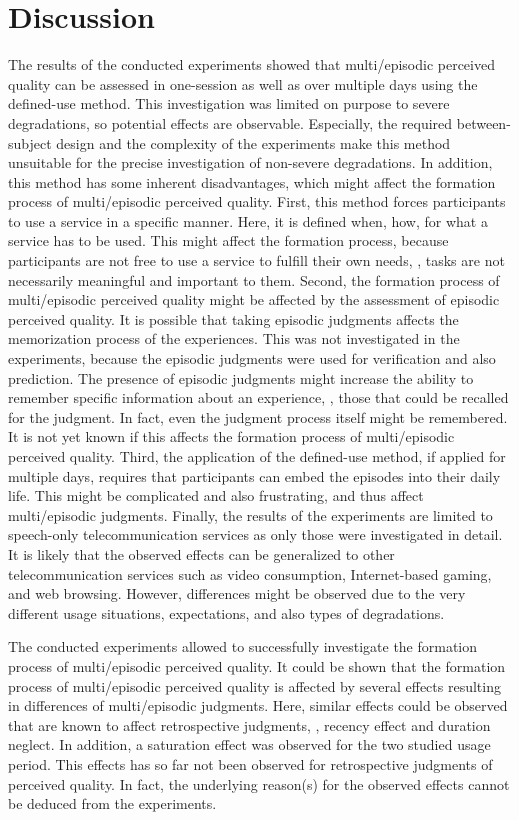\section{Discussion}
The results of the conducted experiments showed that multi\-/episodic perceived quality can be assessed in one-session as well as over multiple days using the defined-use method.
This investigation was limited on purpose to severe degradations, so potential effects are observable.
Especially, the required between-subject design and the complexity of the experiments make this method unsuitable for the precise investigation of non-severe degradations.
In addition, this method has some inherent disadvantages, which might affect the formation process of multi\-/episodic perceived quality.
First, this method forces participants to use a service in a specific manner.
Here, it is defined when, how, for what a service has to be used.
This might affect the formation process, because participants are not free to use a service to fulfill their own needs, \ie, tasks are not necessarily meaningful and important to them.
Second, the formation process of multi\-/episodic perceived quality might be affected by the assessment of episodic perceived quality.
It is possible that taking episodic judgments affects the memorization process of the experiences.
This was not investigated in the experiments, because the episodic judgments were used for verification and also prediction.
The presence of episodic judgments might increase the ability to remember specific information about an experience, \ie, those that could be recalled for the judgment.
In fact, even the judgment process itself might be remembered.
It is not yet known if this affects the formation process of multi\-/episodic perceived quality.
Third, the application of the defined-use method, if applied for multiple days, requires that participants can embed the episodes into their daily life.
This might be complicated and also frustrating, and thus affect multi\-/episodic judgments.
Finally, the results of the experiments are limited to speech-only telecommunication services as only those were investigated in detail.
It is likely that the observed effects can be generalized to other telecommunication services such as video consumption, Internet-based gaming, and web browsing.
However, differences might be observed due to the very different usage situations, expectations, and also types of degradations.

The conducted experiments allowed to successfully investigate the formation process of multi\-/episodic perceived quality.
It could be shown that the formation process of multi\-/episodic perceived quality is affected by several effects resulting in differences of multi\-/episodic judgments.
Here, similar effects could be observed that are known to affect retrospective judgments, \ie, recency effect and duration neglect.
In addition, a saturation effect was observed for the two studied usage period.
This effects has so far not been observed for retrospective judgments of perceived quality.
In fact, the underlying reason(s) for the observed effects cannot be deduced from the experiments.

